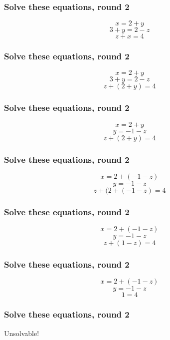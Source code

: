\documentclass{beamer}
\begin{document}
\begin{frame}
  \frametitle{Solve these equations, round 2}

  $$ x = 2 + y $$
  $$ 3 + y = 2 - z $$
  $$ z + x = 4 $$

\end{frame}

\begin{frame}
  \frametitle{Solve these equations, round 2}

  $$ x = 2 + y $$
  $$ 3 + y = 2 - z $$
  $$ z + (2 + y) = 4 $$

\end{frame}

\begin{frame}
  \frametitle{Solve these equations, round 2}

  $$ x = 2 + y $$
  $$ y = -1 - z $$
  $$ z + (2 + y) = 4 $$

\end{frame}

\begin{frame}
  \frametitle{Solve these equations, round 2}

  $$ x = 2 + (-1 - z) $$
  $$ y = -1 - z $$
  $$ z + (2 + (-1 - z) = 4 $$

\end{frame}

\begin{frame}
  \frametitle{Solve these equations, round 2}

  $$ x = 2 + (-1 - z) $$
  $$ y = -1 - z $$
  $$ z + (1 - z) = 4 $$

\end{frame}

\begin{frame}
  \frametitle{Solve these equations, round 2}

  $$ x = 2 + (-1 - z) $$
  $$ y = -1 - z $$
  $$ 1 = 4 $$

\end{frame}

\begin{frame}
  \frametitle{Solve these equations, round 2}

  Unsolvable!

\end{frame}
\end{document}
